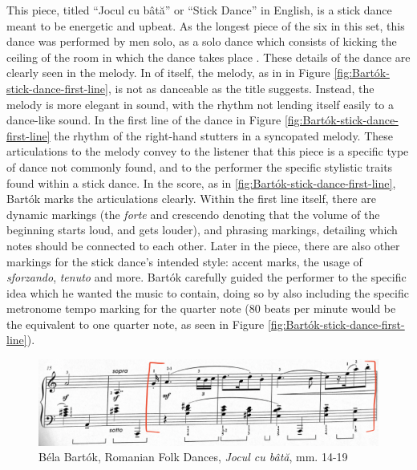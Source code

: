 This piece, titled ``Jocul cu bâtă'' or ``Stick Dance'' in English, is a stick dance meant to be energetic and upbeat. As the longest piece of the six in this set, this dance was performed by men solo, as a solo dance which consists of kicking the ceiling of the room in which the dance takes place \autocite{Weissmann_1969}. These details of the dance are clearly seen in the melody. In of itself, the melody, as in  in Figure \ref{fig:Bartók-stick-dance-first-line}\autocite{Lung_2016}, is not as danceable as the title suggests. Instead, the melody is more elegant in sound, with the rhythm not lending itself easily to a dance-like sound. In the first line of the dance in Figure \ref{fig:Bartók-stick-dance-first-line}\autocite{Lung_2016} the rhythm of the right-hand stutters in a syncopated melody. These articulations to the melody convey to the listener that this piece is a specific type of dance not commonly found, and to the performer the specific stylistic traits found within a stick dance. In the score, as in \ref{fig:Bartók-stick-dance-first-line}\autocite{Lung_2016}, Bartók marks the articulations clearly. Within the first line itself, there are dynamic markings (the \textit{forte} and crescendo denoting that the volume of the beginning starts loud, and gets louder), and phrasing markings, detailing which notes should be connected to each other. Later in the piece, there are also other markings for the stick dance's intended style: accent marks, the usage of \textit{sforzando}, \textit{tenuto} and more. Bartók carefully guided the performer to the specific idea which he wanted the music to contain, doing so by also including the specific metronome tempo marking for the quarter note (80 beats per minute would be the equivalent to one quarter note, as seen in Figure \ref{fig:Bartók-stick-dance-first-line}\autocite{Lung_2016}).

\begin{figure}
  \centering
  \includegraphics[width=\textwidth]{figures/bartok-stick-dance-b-section.jpg}
  \caption{Béla Bartók, Romanian Folk Dances, \textit{Jocul cu bâtă}, mm. 14-19}
  \label{fig:Bartók-stick-dance-b-section}
\end{figure}


